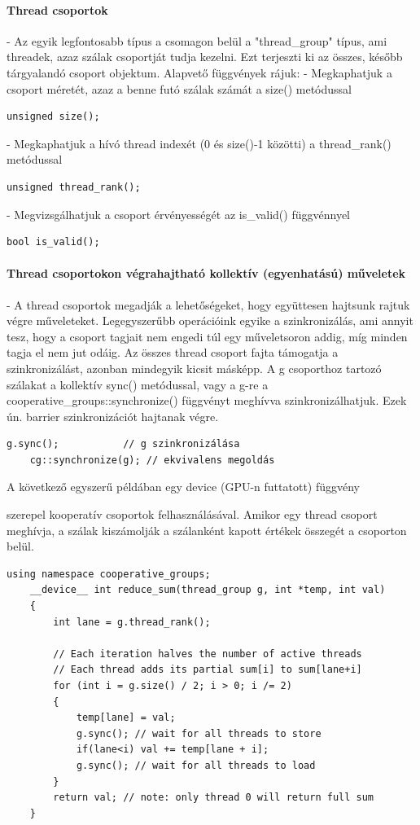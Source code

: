 \paragraph{Thread csoportok}
- Az egyik legfontosabb típus a csomagon belül a "thread\_group" típus, ami threadek, azaz szálak csoportját tudja kezelni. Ezt terjeszti ki az összes, később tárgyalandó csoport objektum. Alapvető függvények rájuk:
\newline{}
- Megkaphatjuk a csoport méretét, azaz a benne futó szálak számát a size() metódussal
\begin{lstlisting}[style=CStyle]
	unsigned size();
\end{lstlisting}
- Megkaphatjuk a hívó thread indexét (0 és size()-1 közötti) a thread\_rank() metódussal
\begin{lstlisting}[style=CStyle]
	unsigned thread_rank();
\end{lstlisting}
- Megvizsgálhatjuk a csoport érvényességét az is\_valid() függvénnyel
\begin{lstlisting}[style=CStyle]
	bool is_valid();
\end{lstlisting}


\paragraph{Thread csoportokon végrahajtható kollektív (egyenhatású) műveletek} -
A thread csoportok megadják a lehetőségeket, hogy együttesen hajtsunk rajtuk végre műveleteket. Legegyszerűbb operációink egyike a szinkronizálás, ami annyit tesz, hogy a csoport tagjait nem engedi túl egy műveletsoron addig, míg minden tagja el nem jut odáig. Az összes thread csoport fajta támogatja a szinkronizálást, azonban mindegyik kicsit másképp.
\newline{}
A g csoporthoz tartozó szálakat a kollektív sync() metódussal, vagy a g-re a cooperative\_groups::synchronize() függvényt meghívva szinkronizálhatjuk. Ezek ún. barrier szinkronizációt hajtanak végre.
\begin{lstlisting}[style=CStyle]
	g.sync();           // g szinkronizálása
	cg::synchronize(g); // ekvivalens megoldás
\end{lstlisting}

\hypertarget{reducesum}{A következő egyszerű példában egy device (GPU-n futtatott) függvény} szerepel kooperatív csoportok felhasználásával. Amikor egy thread csoport meghívja, a szálak kiszámolják a szálanként kapott értékek összegét a csoporton belül.
\begin{lstlisting}[style=CStyle]
	using namespace cooperative_groups;
	__device__ int reduce_sum(thread_group g, int *temp, int val)
	{
		int lane = g.thread_rank();
		
		// Each iteration halves the number of active threads
		// Each thread adds its partial sum[i] to sum[lane+i]
		for (int i = g.size() / 2; i > 0; i /= 2)
		{
			temp[lane] = val;
			g.sync(); // wait for all threads to store
			if(lane<i) val += temp[lane + i];
			g.sync(); // wait for all threads to load
		}
		return val; // note: only thread 0 will return full sum
	}
\end{lstlisting}

